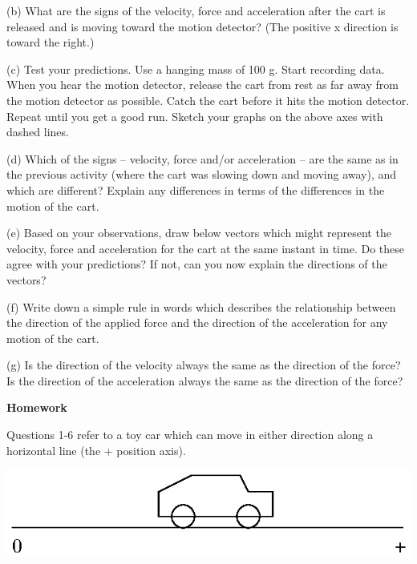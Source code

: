 (b) What are the signs of the velocity, force and acceleration after the cart
is released and is moving toward the motion detector? (The positive x direction
is toward the right.)
\vspace{20mm}

(c) Test your predictions. Use a hanging mass of 100 g. Start recording data.
When you hear the motion detector, release the cart from rest as far away from
the motion detector as possible. Catch the cart before it hits the motion detector.
Repeat until you get a good run. Sketch your graphs on the above axes with dashed
lines.

(d) Which of the signs -- velocity, force and/or acceleration -- are the same as
in the previous activity (where the cart was slowing down and moving away), and
which are different? Explain any differences in terms of the differences in
the motion of the cart.
\vspace{20mm}

(e) Based on your observations, draw below vectors which might represent the
velocity, force and acceleration for the cart at the same instant in time. Do
these agree with your predictions? If not, can you now explain the directions
of the vectors?
\vspace{30mm}

(f) Write down a simple rule in words which describes the relationship between
the direction of the applied force and the direction of the acceleration for
any motion of the cart.
\vspace{20mm}

(g) Is the direction of the velocity always the same as the direction of the
force? Is the direction of the acceleration always the same as the direction
of the force?
\vspace{20mm}

\textbf{Homework }

Questions 1-6 refer to a toy car which can move in either direction along a
horizontal line (the + position axis).

\vspace{0.3cm}
{\par\centering \includegraphics{force2/force2_fig6.eps} \par}
\vspace{0.3cm}

